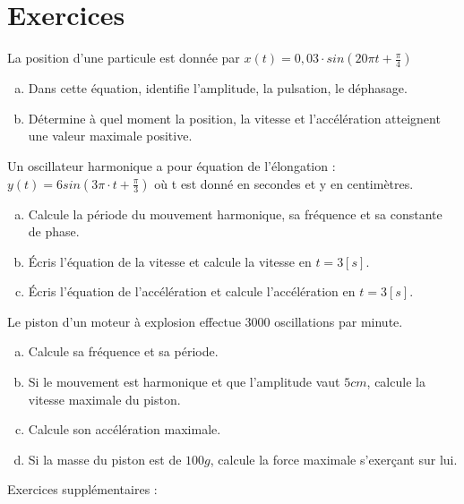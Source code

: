\newpage

\section{Exercices}
\begin{exercise}
    La position d'une particule est donnée par \(x(t)=0,03 \cdot sin(20 \pi t + \frac{\pi}{4})\)
    \begin{enumerate}[a)]
        \item Dans cette équation, identifie l'amplitude, la pulsation, le déphasage.
        \item Détermine à quel moment la position, la vitesse et l'accélération atteignent une valeur maximale positive.
    \end{enumerate}
\end{exercise}

\begin{exercise}
    Un oscillateur harmonique a pour équation de l'élongation : \(y(t)=6sin(3 \pi \cdot t + \frac{\pi}{3})\) où t est donné en secondes et y en centimètres.
    \begin{enumerate}[a)]
        \item Calcule la période du mouvement harmonique, sa fréquence et sa constante de phase.
        \item Écris l'équation de la vitesse et calcule la vitesse en \(t=3[s]\).
        \item Écris l'équation de l'accélération et calcule l'accélération en \(t=3[s]\).
    \end{enumerate}
\end{exercise}

\begin{exercise}
    Le piston d'un moteur à explosion effectue 3000 oscillations par minute.
    \begin{enumerate}[a)]
        \item Calcule sa fréquence et sa période.
        \item Si le mouvement est harmonique et que l'amplitude vaut \(5cm\), calcule la vitesse maximale du piston.
        \item Calcule son accélération maximale.
        \item Si la masse du piston est de \(100g\), calcule la force maximale s'exerçant sur lui.
    \end{enumerate}
\end{exercise}

Exercices supplémentaires :\\


